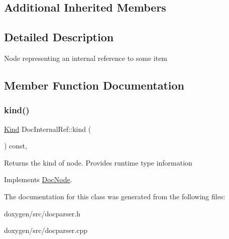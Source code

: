 \subsection*{Additional Inherited Members}


\subsection{Detailed Description}
Node representing an internal reference to some item 

\subsection{Member Function Documentation}
\mbox{\label{class_doc_internal_ref_a8eb9f170bb5693a276a7e2ce0cdae1a4}} 
\subsubsection{\texorpdfstring{kind()}{kind()}}
{\footnotesize\ttfamily \mbox{\hyperlink{class_doc_node_aebd16e89ca590d84cbd40543ea5faadb}{Kind}} Doc\+Internal\+Ref\+::kind (\begin{DoxyParamCaption}{ }\end{DoxyParamCaption}) const\hspace{0.3cm}{\ttfamily [inline]}, {\ttfamily [virtual]}}

Returns the kind of node. Provides runtime type information 

Implements \mbox{\hyperlink{class_doc_node_a108ffd214a72ba6e93dac084a8f58049}{Doc\+Node}}.



The documentation for this class was generated from the following files\+:\begin{DoxyCompactItemize}
\item 
doxygen/src/docparser.\+h\item 
doxygen/src/docparser.\+cpp\end{DoxyCompactItemize}
